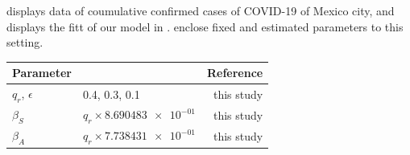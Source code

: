  displays data of coumulative confirmed cases
of COVID-19 of Mexico city, and  displays the fitt
of our model in .
 enclose fixed and estimated parameters to this
setting.

  \begin{table}
    \centering
    \begin{tabular}{@{}llr@{}}
    \toprule
        Parameter
        &   \centering{Median}
        &   Reference
        \\
        \midrule
          $q_r$, $\epsilon$
            &
              \num{.4}, \num{.3}, \num{.1}
            &
              this study
        \\
            $\beta_S$
            & $q_r \times \num{8.690483e-01} $
            & this study
        \\
            $\beta_A$
            & $q_r \times \num{7.738431e-01}$
            & this study


\end{tabular}
\end{table}
